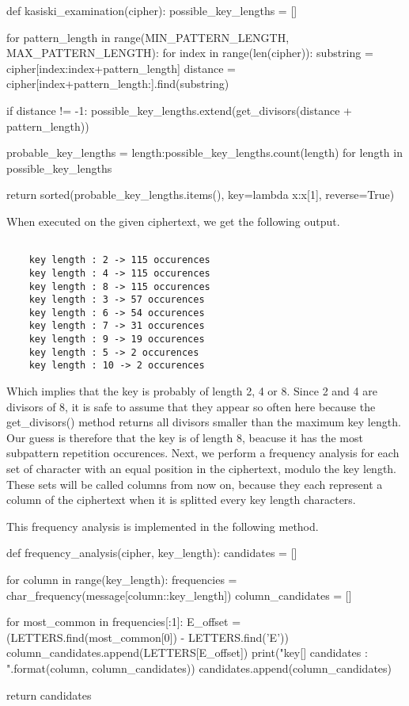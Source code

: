 \documentclass{article}
\begin{document}
\begin{python}
def kasiski_examination(cipher):
    possible_key_lengths = []

    for pattern_length in range(MIN_PATTERN_LENGTH, MAX_PATTERN_LENGTH):
        for index in range(len(cipher)):
            substring = cipher[index:index+pattern_length]
            distance = cipher[index+pattern_length:].find(substring)

            if distance != -1:
                possible_key_lengths.extend(get_divisors(distance + pattern_length))

    probable_key_lengths = {length:possible_key_lengths.count(length) for length in possible_key_lengths}

    return sorted(probable_key_lengths.items(), key=lambda x:x[1], reverse=True)
\end{python}

\bigskip
When executed on the given ciphertext, we get the following output.

\begin{verbatim}

    key length : 2 -> 115 occurences
    key length : 4 -> 115 occurences
    key length : 8 -> 115 occurences
    key length : 3 -> 57 occurences
    key length : 6 -> 54 occurences
    key length : 7 -> 31 occurences
    key length : 9 -> 19 occurences
    key length : 5 -> 2 occurences
    key length : 10 -> 2 occurences

\end{verbatim}

Which implies that the key is probably of length 2, 4 or 8. Since 2 and 4 are divisors of 8, it is safe to assume that they appear so often here because the get\_divisors() method returns all divisors smaller than the maximum key length. Our guess is therefore that the key is of length 8, beacuse it has the most subpattern repetition occurences.
Next, we perform a frequency analysis for each set of character with an equal position in the ciphertext, modulo the key length. These sets will be called columns from now on, because they each represent a column of the ciphertext when it is splitted every key length characters.

This frequency analysis is implemented in the following method.

\bigskip
\begin{python}
def frequency_analysis(cipher, key_length):
    candidates = []

    for column in range(key_length):
        frequencies = char_frequency(message[column::key_length])
        column_candidates = []

        for most_common in frequencies[:1]:
            E_offset = (LETTERS.find(most_common[0]) - LETTERS.find('E')) %
            column_candidates.append(LETTERS[E_offset])
        print("key[{}] candidates : {}".format(column, column_candidates))
        candidates.append(column_candidates)

    return candidates
\end{python}
\bigskip
\end{document}
